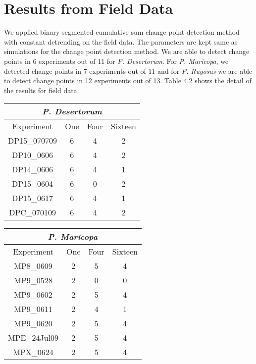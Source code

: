 \section{\label{section:Results from Field Data}Results from Field Data} 
We applied binary segmented cumulative sum change point detection method with constant detrending on the field data. The parameters are kept same as simulations for the change point detection method. We are able to detect change points in 6 experiments out of 11 for \textit{P. Desertorum}. For \textit{P. Maricopa}, we detected change points in 7 experiments out of 11 and for \textit{P. Rugosus} we are able to detect change points in 12 experiments out of 13. Table $4.2$ shows the detail of the results for field data.\par
\begin{table}[h]
	\footnotesize
	\begin{tabular}{|c|c|c|c|}
		\hline
		\multicolumn{4}{|c|}{\textit{P. Desertorum}} \\ \hline
		Experiment & One & Four & Sixteen \\ \hline
		DP15\_070709 & 6 & 4 & 2 \\ \hline
		DP10\_0606 & 6 & 4 & 2 \\ \hline
		DP14\_0606 & 6 & 4 & 1 \\ \hline
		DP15\_0604 & 6 & 0 & 2  \\ \hline   
		DP15\_0617 & 6 & 4 & 1 \\ \hline
		DPC\_070109 & 6 & 4 & 2  \\ \hline
	\end{tabular}
	\hfill
	\begin{tabular}{|c|c|c|c|}
	\hline
		\multicolumn{4}{|c|}{\textit{P. Maricopa}} \\ \hline
		Experiment & One & Four & Sixteen \\ \hline
		MP8\_0609 & 2 & 5 & 4 \\ \hline
		MP9\_0528 & 2 & 0 & 0 \\ \hline
		MP9\_0602 & 2 & 5 & 4 \\ \hline
		MP9\_0611 & 2 & 4 & 1  \\ \hline   
		MP9\_0620 & 2 & 5 & 4 \\ \hline
		MPE\_24Jul09 & 2 & 5 & 4  \\ \hline
		MPX\_0624 & 2 & 5 & 4  \\ \hline  
	\end{tabular}
	\hfill
	\\ \\
	\begin{center}

\end{center}
\end{table}
